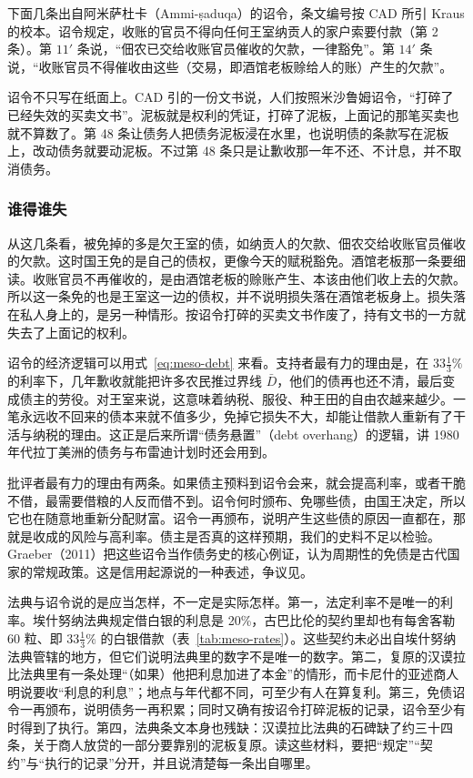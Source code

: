 下面几条出自阿米萨杜卡（Ammi-ṣaduqa）的诏令，条文编号按 CAD 所引 Kraus 的校本。诏令规定，收账的官员不得向任何王室纳贡人的家户索要付款（第 2 条）。第 $11'$ 条说，“佃农已交给收账官员催收的欠款，一律豁免”。第 $14'$ 条说，“收账官员不得催收由这些（交易，即酒馆老板赊给人的账）产生的欠款”\cite{cad_m2}。

诏令不只写在纸面上。CAD 引的一份文书说，人们按照米沙鲁姆诏令，“打碎了已经失效的买卖文书”\cite{cad_m2}。泥板就是权利的凭证，打碎了泥板，上面记的那笔买卖也就不算数了。第 48 条让债务人把债务泥板浸在水里，也说明债的条款写在泥板上，改动债务就要动泥板。不过第 48 条只是让歉收那一年不还、不计息，并不取消债务。

\subsubsection{谁得谁失}
从这几条看，被免掉的多是欠王室的债，如纳贡人的欠款、佃农交给收账官员催收的欠款。这时国王免的是自己的债权，更像今天的赋税豁免。酒馆老板那一条要细读。收账官员不再催收的，是由酒馆老板的赊账产生、本该由他们收上去的欠款。所以这一条免的也是王室这一边的债权，并不说明损失落在酒馆老板身上。损失落在私人身上的，是另一种情形。按诏令打碎的买卖文书作废了，持有文书的一方就失去了上面记的权利。

诏令的经济逻辑可以用式~\eqref{eq:meso-debt} 来看。支持者最有力的理由是，在 $33\tfrac{1}{3}\%$ 的利率下，几年歉收就能把许多农民推过界线 $\bar D$，他们的债再也还不清，最后变成债主的劳役。对王室来说，这意味着纳税、服役、种王田的自由农越来越少。一笔永远收不回来的债本来就不值多少，免掉它损失不大，却能让借款人重新有了干活与纳税的理由。这正是后来所谓“债务悬置”（debt overhang）的逻辑，讲 1980 年代拉丁美洲的债务与布雷迪计划时还会用到。

批评者最有力的理由有两条。如果债主预料到诏令会来，就会提高利率，或者干脆不借，最需要借粮的人反而借不到。诏令何时颁布、免哪些债，由国王决定，所以它也在随意地重新分配财富。诏令一再颁布，说明产生这些债的原因一直都在，那就是收成的风险与高利率。债主是否真的这样预期，我们的史料不足以检验。Graeber（2011）把这些诏令当作债务史的核心例证\cite{graeber2011}，认为周期性的免债是古代国家的常规政策。这是信用起源说的一种表述，争议见。

\begin{pitfall}
法典与诏令说的是应当怎样，不一定是实际怎样。第一，法定利率不是唯一的利率。埃什努纳法典规定借白银的利息是 20\%，古巴比伦的契约里却也有每舍客勒 60 粒、即 $33\tfrac{1}{3}\%$ 的白银借款（表~\ref{tab:meso-rates}）。这些契约未必出自埃什努纳法典管辖的地方，但它们说明法典里的数字不是唯一的数字。第二，复原的汉谟拉比法典里有一条处理“（如果）他把利息加进了本金”的情形\cite{cad_s}，而卡尼什的亚述商人明说要收“利息的利息”\cite{cad_s}；地点与年代都不同，可至少有人在算复利。第三，免债诏令一再颁布，说明债务一再积累；同时又确有按诏令打碎泥板的记录，诏令至少有时得到了执行。第四，法典条文本身也残缺：汉谟拉比法典的石碑缺了约三十四条，关于商人放贷的一部分要靠别的泥板复原。读这些材料，要把“规定”“契约”与“执行的记录”分开，并且说清楚每一条出自哪里。
\end{pitfall}

